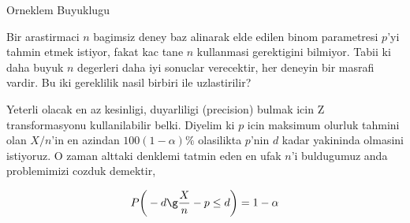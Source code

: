 \documentclass[12pt,fleqn]{article}\usepackage{../common}
\begin{document}
Orneklem Buyuklugu

Bir arastirmaci $n$ bagimsiz deney baz alinarak elde edilen binom
parametresi $p$'yi tahmin etmek istiyor, fakat kac tane $n$ kullanmasi
gerektigini bilmiyor. Tabii ki daha buyuk $n$ degerleri daha iyi sonuclar
verecektir, her deneyin bir masrafi vardir. Bu iki gereklilik nasil birbiri
ile uzlastirilir?

Yeterli olacak en az kesinligi, duyarliligi (precision) bulmak icin Z
transformasyonu kullanilabilir belki. Diyelim ki $p$ icin maksimum olurluk
tahmini olan $X/n$'in en azindan $100(1-\alpha)\%$ olasilikta $p$'nin $d$
kadar yakininda olmasini istiyoruz. O zaman alttaki denklemi tatmin eden en
ufak $n$'i buldugumuz anda problemimizi cozduk demektir, 

$$ P\bigg( -d \g \frac{X}{n} - p \le d \bigg)  = 1-\alpha$$
\end{document}
